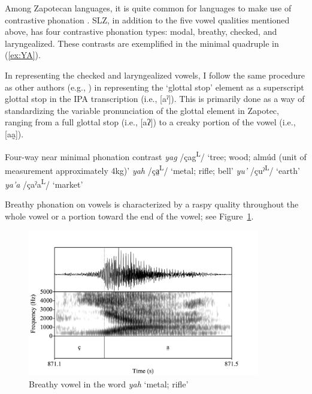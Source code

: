 \documentclass[12pt, letterpaper]{article}
\newcommand{\supr}[1]{\textsuperscript{#1}}
\begin{document}
Among Zapotecan languages, it is quite common for languages to make use of contrastive phonation \citep[e.g.,][]{avelinobecerraTopicsYalalagZapotec2004,longDiccionarioZapotecoSan2005,avelinoAcousticElectroglottographicAnalyses2010,lopeznicolasEstudiosFonologiaGramatica2016,chavez-peonInteractionMetricalStructure2010}. 
SLZ, in addition to the five vowel qualities mentioned above, has four contrastive phonation types: modal, breathy, checked, and laryngealized. These contrasts are exemplified in the minimal quadruple in (\ref{ex:YA}).

In representing the checked and laryngealized vowels, I follow the same procedure as other authors (e.g., \citet{avelinoAcousticElectroglottographicAnalyses2010, uchiharaToneRegistrogenesisQuiavini2016}) in representing the `glottal stop' element as a superscript glottal stop in the IPA transcription (i.e., [aˀ]). This is primarily done as a way of standardizing the variable pronunciation of the glottal element in Zapotec, ranging from a full glottal stop (i.e., [aʔ]) to a creaky portion of the vowel (i.e., [aa̰]).  

\ea \label{ex:YA} Four-way near minimal phonation contrast
    \ea \textit{yag}  /çag\supr{L}/ `tree; wood; almúd (unit of measurement approximately 4kg)'
    \ex \textit{yah}  /ça̤\supr{L}/ `metal; rifle; bell'
    \ex \textit{yu'}  /çuˀ\supr{L}/  `earth'
    \ex \textit{ya'a}  /çaˀa\supr{L}/  `market'
    \z 
\z 

Breathy phonation on vowels is characterized by a raspy quality throughout the whole vowel or a portion toward the end of the vowel; see Figure~\ref{fig:BreathyVowel}. 

\begin{figure}[!h]
	\centering
	\includegraphics[width=0.9\textwidth]{Images/yah.png}
	\caption{Breathy vowel in the word \textit{yah} `metal; rifle'}
	\label{fig:BreathyVowel}
\end{figure}
\end{document}
